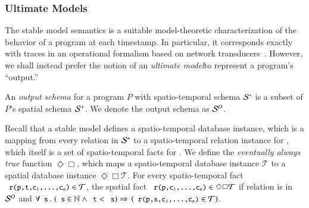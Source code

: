 
\subsubsection{Ultimate Models}
The stable model semantics is a suitable model-theoretic characterization of the behavior of a program at each timestamp.  In particular, it corresponds exactly with traces in an operational formalism based on network transducers~\cite{ameloot-operational}.  However, we shall instead prefer the notion of an {\em ultimate model}to represent a program's ``output.''



An {\em output schema} for a \lang program $P$ with spatio-temporal schema
$\stschema$ is a subset of $P$'s spatial schema $\sschema$.  We denote the output schema as
$\oschema$.

Recall that a stable model defines a spatio-temporal database instance, which is a mapping from every relation  in $\stschema$ to a spatio-temporal relation instance for , which itself is a set of spatio-temporal facts for .  We define the {\em eventually always true} function $\Diamond\Box$, which maps a spatio-temporal database instance $\mathcal{T}$ to a spatial database instance $\Diamond\Box\mathcal{T}$.  For every spatio-temporal fact $\dedalus{r(p,t,c\sub{1},\ldots,c\sub{n})} \in \mathcal{T}$, the spatial fact $\dedalus{r(p,c\sub{1},\ldots,c\sub{n})} \in \Diamond\Box\mathcal{T}$ if relation  is in $\oschema$ and $\forall \dedalus{s}\, . \, \left(\dedalus{s} \in \mathbb{N} \land \dedalus{t} < \dedalus{s}\right) \Rightarrow$ \linebreak $\left(\dedalus{r(p,s,c\sub{1},\ldots,c\sub{n})} \in \mathcal{T}\right)$.

